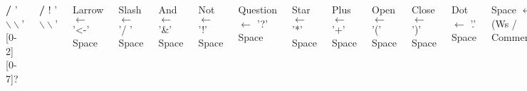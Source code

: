 \begin{frame}
\begin{minipage}{\textwidth}
\begin{columns}
		\textbf{/}  '$\backslash\backslash$' [0-2][0-7]?
		
		\textbf{/}	!  '$\backslash\backslash$'

		\tiny
		Larrow $\leftarrow$ '<-' Space
		
		Slash $\leftarrow$ '/ ' Space
		
		And $\leftarrow$ '\&' Space
		
		Not $\leftarrow$ '!' Space
		
		Question $\leftarrow$ '?' Space
		
		Star $\leftarrow$ '*' Space
		
		Plus $\leftarrow$ '+' Space
		
		Open $\leftarrow$ '(' Space
		
		Close $\leftarrow$ ')' Space
		
		Dot $\leftarrow$ '.' Space
		
		Space $\leftarrow$ (Ws /  Comment)*
		
		Comment $\leftarrow$ '\#' (!EOL .)* EOL
		
		Space $\leftarrow$ '  ' \textbf{/}	'$\backslash$t' \textbf{/}
		
		EOL $\leftarrow$ '$\backslash$r$\backslash$n' \textbf{/} '$\backslash$n' \textbf{/} '$\backslash$r'
		
		EOF $\leftarrow$ ! .
		
		
			
\end{columns}
\end{minipage}
\end{frame}

